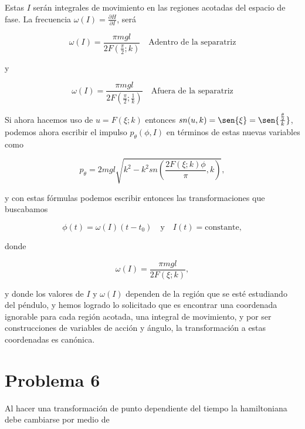 \documentclass[a4paper,10pt]{article}
\numberwithin{equation}{section}
\begin{document}
Estas $I$ serán integrales de movimiento en las regiones acotadas del espacio de fase. 
La frecuencia $\omega(I) = \frac{\partial H}{\partial I}$, será 

\begin{equation}
 \omega(I) = \frac{\pi mgl}{2F\left(\frac{\pi}{2};k\right)} \quad \text{Adentro de la 
 separatriz}
\end{equation}

y 

\begin{equation}
 \omega(I) = \frac{\pi mgl}{2F\left(\frac{\pi}{2};\frac{1}{k}\right)} \quad \text{Afuera de la 
 separatriz}
\end{equation}

Si ahora hacemos uso de $u = F(\xi;k)$ entonces $sn(u,k) = \sen{\xi} = \sen{\frac{\frac{\theta}{2}}{k}}$, 
podemos ahora escribir el impulso $p_\theta(\phi,I)$ en términos de estas nuevas variables 
como 

\begin{equation}
 p_\theta = 2mgl \sqrt{k^2 - k^2sn\left(\frac{2F(\xi;k)\phi}{\pi},k \right)},
\end{equation}

y con estas fórmulas podemos escribir entonces las transformaciones que buscabamos 

\begin{equation}
 \phi(t) = \omega(I)(t-t_0) \quad \text{y} \quad I(t) = \text{constante},
\end{equation}

donde 

\begin{equation}
 \omega(I) = \frac{\pi mgl}{2F(\xi;k)},
\end{equation}

y donde los valores de $I$ y $\omega(I)$ dependen de la región que se esté estudiando 
del péndulo, y hemos logrado lo solicitado que es encontrar una coordenada ignorable 
para cada región acotada, una integral de movimiento, y por ser construcciones de variables 
de acción y ángulo, la transformación a estas coordenadas es canónica.









\section{Problema 6}

Al hacer una transformación de punto dependiente del tiempo la hamiltoniana 
debe cambiarse por medio de 
\end{document}
